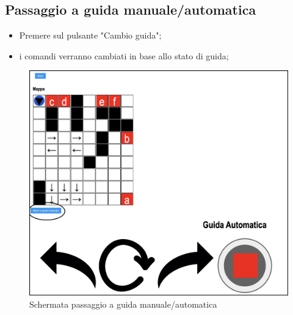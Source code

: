\subsection{Passaggio a guida manuale/automatica}
\begin{itemize}
    \item Premere sul pulsante "Cambio guida";
    \item i comandi verranno cambiati in base allo stato di guida;
\end{itemize}
\begin{figure}[H]
    \centering
    \includegraphics[scale=0.45]{res/images/forklift_cambioguida.png}
    \caption{Schermata passaggio a guida manuale/automatica}
\end{figure}
\pagebreak

